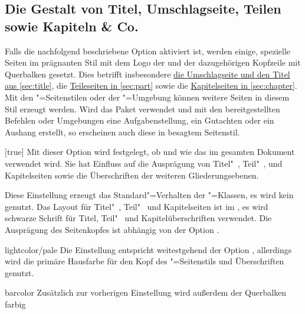 \begin{Declaration*}{}
\begin{Declaration*}{}
\begin{Declaration*}{}
\subsection{Die Gestalt von Titel, Umschlagseite, Teilen sowie Kapiteln \& Co.}
%
%
%
%
Falls die nachfolgend beschriebene Option  aktiviert ist, 
werden einige, spezielle Seiten im prägnanten Stil mit dem Logo der \TnUD und 
der dazugehörigen Kopfzeile mit Querbalken gesetzt. Dies betrifft insbesondere 
\hyperref[sec:title]{die Umschlagseite und den Titel aus \autoref{sec:title}}, 
die \hyperref[sec:part]{Teileseiten in \autoref{sec:part}} sowie die
\hyperref[sec:chapter]{Kapitelseiten in \autoref{sec:chapter}}. Mit den 
"=Seitenstilen oder der "=Umgebung 
können weitere Seiten in diesem Stil erzeugt werden. Wird das Paket 
 verwendet und mit den bereitgestellten Befehlen oder 
Umgebungen eine Aufgabenstellung, ein Gutachten oder ein Aushang erstellt, so 
erscheinen auch diese in besagtem Seitenstil.
%
\begin{Declaration}[%
  v2.03!\Option{cd=bicolor}:%
    Farbeinsatz nur im Kopf mit farbig abgesetztem Querbalken;
  v2.03!\Option{cd=fullcolor}:%
    voller Farbeinsatz mit farbig abgesetztem Querbalken;%
  v2.04!\Option{cd=barcolor}:nur farbig abgesetzter Querbalken;%
]{}[true]
\printdeclarationlist%
%
Mit dieser Option wird festgelegt, ob und wie das \TUDCD im gesamten Dokument 
verwendet wird. Sie hat Einfluss auf die Ausprägung von Titel"~, Teil"~, und 
Kapitelseiten sowie die Überschriften der weiteren Gliederungsebenen.
%
\begin{values}{}
\itemfalse
  Diese Einstellung erzeugt das Standard"=Verhalten der \KOMAScript"=Klassen, 
  es wird kein \CD genutzt.
  Das Layout für Titel"~, Teil"~ und Kapitelseiten ist im \CD, es wird 
  schwarze Schrift für Titel, Teil"~ und Kapitelüberschriften verwendet. Die 
  Ausprägung des Seitenkopfes ist abhängig von der Option .
\item[lightcolor/pale]
  Die Einstellung entspricht weitestgehend der Option , 
  allerdings wird die primäre Hausfarbe  für den Kopf des 
  "=Seitenstils und Überschriften genutzt.
\item[barcolor]
  Zusätzlich zur vorherigen Einstellung wird außerdem der Querbalken farbig 

\end{values}
\end{Declaration}
\end{Declaration*}
\end{Declaration*}
\end{Declaration*}
